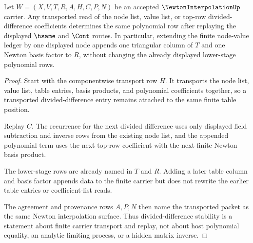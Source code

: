 \begin{theorem}
\label{thm:newton-interpolation-divided-difference-stability}
Let $W=(X,V,T,R,A,H,C,P,N)$ be an accepted $\NewtonInterpolationUp$ carrier. Any transported read of the node list, value list, or top-row divided-difference coefficients determines the same polynomial row after replaying the displayed $\hsame$ and $\Cont$ routes. In particular, extending the finite node-value ledger by one displayed node appends one triangular column of $T$ and one Newton basis factor to $R$, without changing the already displayed lower-stage polynomial rows.
\end{theorem}
\begin{proof}
Start with the componentwise transport row $H$. It transports the node list, value list, table entries, basis products, and polynomial coefficients together, so a transported divided-difference entry remains attached to the same finite table position.

Replay $C$. The recurrence for the next divided difference uses only displayed field subtraction and inverse rows from the existing node list, and the appended polynomial term uses the next top-row coefficient with the next finite Newton basis product.

The lower-stage rows are already named in $T$ and $R$. Adding a later table column and basis factor appends data to the finite carrier but does not rewrite the earlier table entries or coefficient-list reads.

The agreement and provenance rows $A,P,N$ then name the transported packet as the same Newton interpolation surface. Thus divided-difference stability is a statement about finite carrier transport and replay, not about host polynomial equality, an analytic limiting process, or a hidden matrix inverse.
\end{proof}



